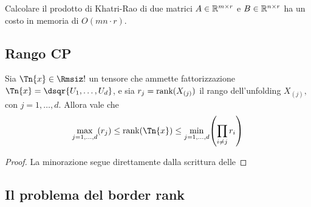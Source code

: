 \begin{remark}
  Calcolare il prodotto di Khatri-Rao di due matrici $ A \in \mathbb{R}^{m \times r} $ e $ B \in \mathbb{R}^{n \times
  r} $ ha un costo in memoria di $ O(mn
  \cdot r) $.
\end{remark}


\subsection{Rango CP}

\begin{proposition}
  Sia $ \Tn{x} \in \Rmsiz! $ un tensore che ammette fattorizzazione $ \Tn{x} = \dsqr{U_1, \ldots,
  U_d} $, e sia $ r_j = \text{rank}(X_{(j)}) $ il rango dell'unfolding $ X_{(j)}, $ con $ j = 1, \ldots, d $. Allora vale che
  \begin{equation}
    \max_{j=1, \ldots, d}(r_j) \le \rk(\Tn{x}) \le \min_{j=1, \ldots, d}\left( \prod_{i \neq j}r_i \right)
  \end{equation}
\end{proposition}
\begin{proof}
  La minorazione segue direttamente dalla scrittura delle
  
\end{proof}

\subsection{Il problema del border rank}


